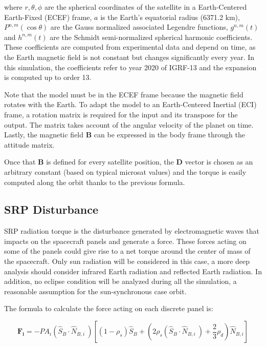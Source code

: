 where $r, \theta, \phi$ are the spherical coordinates of the satellite in a Earth-Centered Earth-Fixed (ECEF) frame, $a$ is the Earth's equatorial radius (6371.2 km), $P^{n,m} (\cos \theta)$ are the Gauss normalized associated Legendre functions, $g^{n,m} (t)$ and $h^{n,m} (t)$ are the Schmidt semi-normalized spherical harmonic coefficients.
These coefficients are computed from experimental data and depend on time, as the Earth magnetic field is not constant but changes significantly every year. In this simulation, the coefficients refer to year 2020 of IGRF-13 and the expansion is computed up to order 13.

Note that the model must be in the ECEF frame because the magnetic field rotates with the Earth. To adapt the model to an Earth-Centered Inertial (ECI) frame, a rotation matrix is required for the input and its transpose for the output. The matrix takes account of the angular velocity of the planet on time. Lastly, the magnetic field $\boldsymbol{B}$ can be expressed in the body frame through the attitude matrix.

Once that $\boldsymbol{B}$ is defined for every satellite position, the $\boldsymbol{D}$ vector is chosen as an arbitrary constant (based on typical microsat values) and the torque is easily computed along the orbit thanks to the previous formula.


\subsection{SRP Disturbance}
\label{subsec:dist_SRP}
SRP radiation torque is the disturbance generated by electromagnetic waves that impacts on
the spacecraft panels and generate a force. These forces acting on some of the panels could give rise to 
a net torque around the center of mass of the spacecraft. Only sun radiation will be considered 
in this case, a more deep analysis should consider infrared Earth radiation and reflected Earth radiation. 
In addition, no eclipse condition will be analyzed during all the simulation, a reasonable assumption for the 
sun-synchronous case orbit.

The formula to calculate the force acting on each discrete panel is:

\begin{equation}
    \boldsymbol{F_i} = -PA_i \left( \hat{S}_B \cdot \hat{N}_{B,i}\ \right) \left[ \left(1 - \rho_s \right)\hat{S}_B + \left(2\rho_s\left( \hat{S}_B \cdot \hat{N}_{B,i}\ \right) + \frac{2}{3}\rho_d \right) \hat{N}_{B,i}\right] 
\end{equation}

